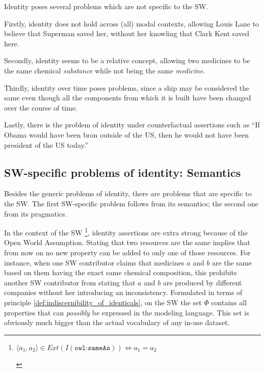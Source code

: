 Identity poses several problems which are not specific to the SW.

Firstly, identity does not hold across (all) modal contexts,
  allowing Louis Lane to believe that Superman saved her,
  without her knowling that Clark Kent saved here.

Secondly, identity seems to be a relative concept\cite{Geach},
  allowing two medicines to be the same chemical \emph{substance}
  while not being the same \emph{medicine}.

Thirdly, identity over time poses problems,
  since a ship may be considered the same
  even though all the components from which it is built
  have been changed over the course of time.\cite{}

Lastly, there is the problem of identity under counterfactual assertions
  such as ``If Obama would have been bron outside of the US,
  then he would not have been president of the US today.''\cite{Kripke1980}

\subsection{SW-specific problems of identity: Semantics}

Besides the generic problems of identity,
  there are problems that are specific to the SW.
The first SW-specific problem follows from its semantics;
  the second one from its pragmatics.

In the context of the SW
  \footnote{
    \begin{definition}
    \label{def:owl_sameAs}
    $\langle a_1, a_2 \rangle \in Ext(I(\texttt{owl:sameAs})) \iff a_1 = a_2$
    \end{definition}
  },
  identity assertions are extra strong
  because of the Open World Assumption.
Stating that two resources are the same
  implies that from now on no new property can be added
  to only one of those resources.
For instance, when one SW contributor claims that
  medicines $a$ and $b$ are the same
  based on them having the exact same chemical composition,
  this prohibits another SW contributor from stating that
  $a$ and $b$ are produced by different companies
  without her introducing an inconsistency.
Formulated in terms of principle \ref{def:indiscernibility_of_identicals},
  on the SW the set $\Phi$ contains
  all properties that can \emph{possibly} be expressed
  in the modeling language.
This set is obviously much bigger than the actual vocabulary
  of any in-use dataset.

